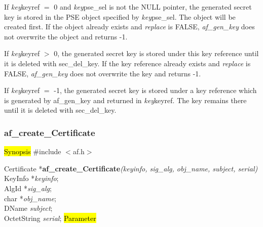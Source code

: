 If {\em key}\pf keyref $=$ 0 and {\em key}\pf pse\_sel is not the NULL pointer, the generated secret key
is stored in the PSE object specified by {\em key}\pf pse\_sel. The object will be
created first. 
If the object already exists and {\em replace} is FALSE, {\em af\_gen\_key}
does not overwrite the object and returns -1.
 
If {\em key}\pf keyref $>$ 0, the generated secret key is stored under this key reference until it is
deleted with sec\_del\_key. 
If the key reference already exists and {\em replace} is FALSE, {\em af\_gen\_key}
does not overwrite the key and returns -1.
 
If {\em key}\pf keyref $=$ -1, the generated secret key is stored under a key reference which is generated 
by af\_gen\_key and returned in {\em key}\pf keyref. The key remains there until it is deleted
with sec\_del\_key.

\subsubsection{af\_create\_Certificate}
\label{af_make_certificate}
\hl{Synopsis}
\#include $<$af.h$>$

Certificate *{\bf af\_create\_Certificate}{\em (keyinfo, sig\_alg, obj\_name, subject, serial)} \\
KeyInfo *{\em keyinfo}; \\
AlgId *{\em sig\_alg}; \\
char *{\em obj\_name}; \\
DName {\em *subject}; \\
OctetString {\em *serial};
\hl{Parameter}





